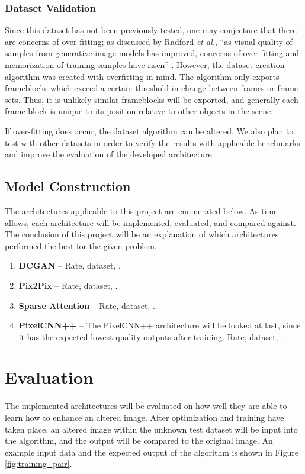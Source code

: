 \documentclass[letterpaper]{article} %
\begin{document}
\subsubsection{Dataset Validation}
Since this dataset has not been previously tested, one may conjecture that there are
concerns of over-fitting; as discussed by Radford \textit{et al.},
``as visual quality of samples from generative image models has improved, concerns of
over-fitting and memorization of training samples have risen''
\cite{unsupervised_learning}.
However, the dataset creation algorithm was created with overfitting in mind.
The algorithm only exports frameblocks which exceed a certain threshold in change
between frames or frame sets. Thus, it is unlikely similar frameblocks will be exported,
and generally each frame block is unique to its position relative to other objects in the scene.

If over-fitting does occur,
the dataset algorithm can be altered.
We also plan to test with other datasets in order to verify the results with applicable benchmarks
and improve the evaluation of the developed architecture.

\subsection{Model Construction}
\label{subsec:model}
The architectures applicable to this project are enumerated below.
As time allows, each architecture will be implemented, evaluated, and compared
against. The conclusion of this project will be an explanation of which architectures performed the best
for the given problem.
\begin{enumerate}
\item \textbf{DCGAN} --
Rate, dataset, \cite{dcgan_git}.
\item \textbf{Pix2Pix} --
Rate, dataset, \cite{pix2pix_git}.
\item \textbf{Sparse Attention} --
Rate, dataset, \cite{sparse_attention_git}.
\item \textbf{PixelCNN++} --
The PixelCNN++ architecture will be looked at last, since it has the expected lowest
quality outputs after training.
Rate, dataset, \cite{pixelcnn++_git}.
\end{enumerate}

\section{Evaluation}
\label{sec:methods/evaluation}
The implemented architectures will be evaluated on how well they are able to learn how to
enhance an altered image. After optimization and training have taken place,
an altered image within the unknown test dataset will be input into the algorithm, and the output
will be compared to the original image. An example input data and the expected output
of the algorithm is shown in Figure \ref{fig:training_pair}.
\end{document}
